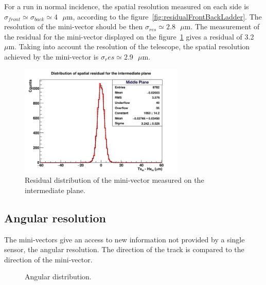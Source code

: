     For a run in normal incidence, the spatial resolution measured on each side is $\sigma_{front} \simeq \sigma_{back} \simeq 4 \text{ }\mu\text{m}$, according to the figure~\ref{fig:residualFrontBackLadder}.
    The resolution of the mini-vector should be then $\sigma_{res} \simeq 2.8 \text{ }\mu\text{m}$.
    The measurement of the residual for the mini-vector displayed on the figure~\ref{fig:residualMV} gives a residual of 3.2 $\mu\text{m}$.
    Taking into account the resolution of the telescope, the spatial resolution achieved by the mini-vector is $\sigma_res{} \simeq 2.9 \text{ }\mu\text{m}$.

    \begin{figure}[h]
      \centering
      \includegraphics[width = 0.7\textwidth]{Pictures/deformation/hDiffPosX_226056.png}
      \caption{Residual distribution of the mini-vector measured on the intermediate plane.}
      \label{fig:residualMV}
    \end{figure}

   \subsection{Angular resolution}

   The mini-vectors give an access to new information not provided by a single sensor, the angular resolution.
   The direction of the track is compared to the direction of the mini-vector.
   
   \begin{figure}
     \caption{Angular distribution.}
     \label{fig:angRes}
   \end{figure}

